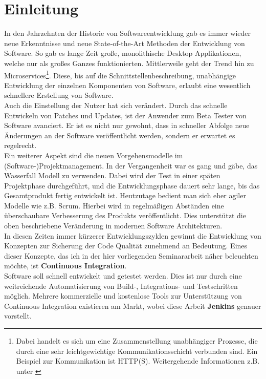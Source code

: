 \chapter*{Einleitung}
In den Jahrzehnten der Historie von Softwareentwicklung gab es immer wieder neue Erkenntnisse und neue State-of-the-Art Methoden der Entwicklung von Software. So gab es lange Zeit große, monolithische Desktop Applikationen, welche nur als großes Ganzes funktionierten. Mittlerweile geht der Trend hin zu Microservices\footnote{Dabei handelt es sich um eine Zusammenstellung unabhängiger Prozesse, die durch eine sehr leichtgewichtige Kommunikationsschicht verbunden sind. Ein Beispiel zur Kommunikation ist HTTP(S). Weitergehende Informationen z.B. unter \cite{fowler-Microservice}}. Diese, bis auf die Schnittstellenbeschreibung, unabhängige Entwicklung der einzelnen Komponenten von Software, erlaubt eine wesentlich schnellere Erstellung von Software.\\
Auch die Einstellung der Nutzer hat sich verändert. Durch das schnelle Entwickeln von Patches und Updates, ist der Anwender zum Beta Tester von Software avanciert. Er ist es nicht nur gewohnt, dass in schneller Abfolge neue Änderungen an der Software veröffentlicht werden, sondern er erwartet es regelrecht.\\
Ein weiterer Aspekt sind die neuen Vorgehensmodelle im (Software-)Projektmanagement. In der Vergangenheit war es gang und gäbe, das Wasserfall Modell zu verwenden. Dabei wird der Test in einer späten Projektphase durchgeführt, und die Entwicklungsphase dauert sehr lange, bis das Gesamtprodukt fertig entwickelt ist. Heutzutage bedient man sich eher agiler Modelle wie z.B. Scrum. Hierbei wird in  regelmäßigen Abständen eine überschaubare Verbesserung des Produkts veröffentlicht. Dies unterstützt die oben beschriebene Veränderung in modernen Software Architekturen.\\
In diesen Zeiten immer kürzerer Entwicklungszyklen gewinnt die Entwicklung von Konzepten zur Sicherung der Code Qualität zunehmend an Bedeutung. Eines dieser Konzepte, das ich in der hier vorliegenden Seminararbeit näher beleuchten möchte, ist \textbf{Continuous Integration}.\\
Software soll schnell entwickelt und getestet werden. Dies ist nur durch eine weitreichende Automatisierung von Build-, Integrations- und Testschritten möglich. Mehrere kommerzielle und kostenlose Tools zur Unterstützung von Continuous Integration existieren am Markt, wobei diese Arbeit \textbf{Jenkins} genauer vorstellt.